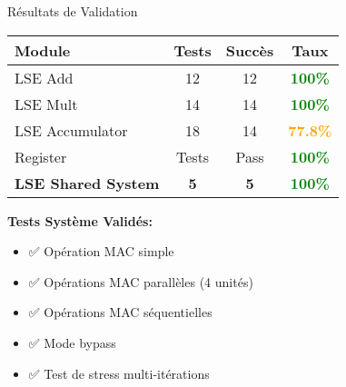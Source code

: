\documentclass[aspectratio=169]{beamer}
\begin{document}
\begin{frame}{Résultats de Validation}
\begin{table}
\small
\begin{tabular}{|l|c|c|c|}
\hline
\textbf{Module} & \textbf{Tests} & \textbf{Succès} & \textbf{Taux} \\
\hline
LSE Add & 12 & 12 & \textcolor{green}{\textbf{100\%}} \\
\hline
LSE Mult & 14 & 14 & \textcolor{green}{\textbf{100\%}} \\
\hline
LSE Accumulator & 18 & 14 & \textcolor{orange}{\textbf{77.8\%}} \\
\hline
Register & Tests & Pass & \textcolor{green}{\textbf{100\%}} \\
\hline
\textbf{LSE Shared System} & \textbf{5} & \textbf{5} & \textcolor{green}{\textbf{100\%}} \\
\hline
\end{tabular}
\end{table}

\vspace{0.3cm}
\textbf{Tests Système Validés:}
\begin{itemize}
\item ✅ Opération MAC simple
\item ✅ Opérations MAC parallèles (4 unités)
\item ✅ Opérations MAC séquentielles
\item ✅ Mode bypass
\item ✅ Test de stress multi-itérations
\end{itemize}
\end{frame}
\end{document}
